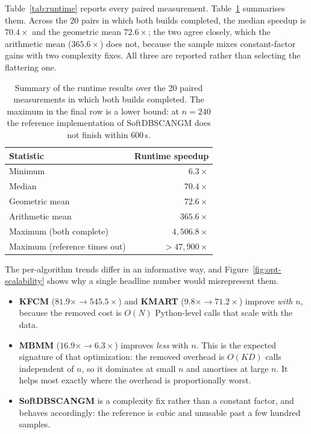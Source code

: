 Table~\ref{tab:runtime} reports every paired measurement.
Table~\ref{tab:opt-summary} summarises them. Across the 20 pairs in which
both builds completed, the median speedup is $70.4\times$ and the
geometric mean $72.6\times$; the two agree closely, which the arithmetic
mean ($365.6\times$) does not, because the sample mixes constant-factor
gains with two complexity fixes. All three are reported rather than
selecting the flattering one.

\begin{table}[t]
\centering
\caption{Summary of the runtime results over the 20 paired measurements
in which both builds completed. The maximum in the final row is a lower
bound: at $n = 240$ the reference implementation of SoftDBSCANGM does not
finish within $600$\,s.}
\label{tab:opt-summary}
\begin{tabular}{lr}
\toprule
Statistic & Runtime speedup \\
\midrule
Minimum                 & $6.3\times$ \\
Median                  & $\mathbf{70.4\times}$ \\
Geometric mean          & $\mathbf{72.6\times}$ \\
Arithmetic mean         & $365.6\times$ \\
Maximum (both complete) & $4{,}506.8\times$ \\
Maximum (reference times out) & $> 47{,}900\times$ \\
\bottomrule
\end{tabular}
\end{table}



The per-algorithm trends differ in an informative way, and
Figure~\ref{fig:opt-scalability} shows why a single headline number would
misrepresent them.

\begin{itemize}
  \item \textbf{KFCM} ($81.9\times \to 545.5\times$) and \textbf{KMART}
        ($9.8\times \to 71.2\times$) improve \emph{with} $n$, because the
        removed cost is $O(N)$ Python-level calls that scale with the
        data.
  \item \textbf{MBMM} ($16.9\times \to 6.3\times$) improves \emph{less}
        with $n$. This is the expected signature of that optimization:
        the removed overhead is $O(KD)$ calls independent of $n$, so it
        dominates at small $n$ and amortises at large $n$. It helps most
        exactly where the overhead is proportionally worst.
  \item \textbf{SoftDBSCANGM} is a complexity fix rather than a constant
        factor, and behaves accordingly: the reference is cubic and
        unusable past a few hundred samples.
\end{itemize}

